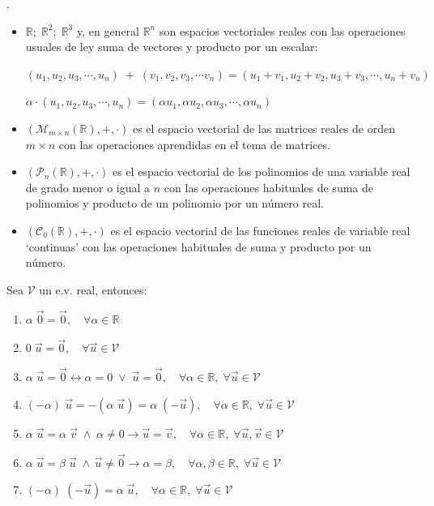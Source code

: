 \begin{ejem}.

\begin{itemize}

\item $\mathbb R; \; \mathbb R^2; \; \mathbb R^3$ y, en general $\mathbb R^n$  son espacios vectoriales reales con las operaciones usuales de ley suma de vectores y producto por un escalar:

$(u_1,u_2,u_3, \cdots, u_n)\; +\; (v_1,v_2,v_3, \cdots v_n)=(u_1+v_1, u_2+v_2, u_3+v_3, \cdots , u_n+v_n)$

 $\alpha \cdot (u_1,u_2,u_3, \cdots, u_n) =(\alpha u_1,\alpha u_2,\alpha u_3, \cdots, \alpha u_n)$

\item $(\mathcal M_{m \times n}(\mathbb R),+,\cdot)$ es el espacio vectorial de las matrices reales de orden $m \times n$ con las operaciones aprendidas en el tema de matrices.

\item $(\mathcal P_n(\mathbb R), +, \cdot)$ es el espacio vectorial de los polinomios de una variable real de grado menor o igual a $n$ con las operaciones habituales de suma de polinomios y producto de un polinomio por un número real.

\item $(\mathcal C_0(\mathbb R), +, \cdot)$ es el espacio vectorial de las funciones reales de variable real `continuas' con las operaciones habituales de suma y producto por un número.
\end{itemize}
\end{ejem}

\begin{prop} Sea $\mathcal V$ un e.v. real, entonces:
\begin{enumerate}[P1. ]
\item $\alpha \; \vec 0=\vec 0,\quad \forall \alpha \in \mathbb R$
\item $0 \; \vec u= \vec 0, \quad \forall \vec u \in \mathcal V$
\item $\alpha \; \vec u = \vec 0 \leftrightarrow \alpha = 0 \; \vee \; \vec u= \vec 0, \quad \forall \alpha \in \mathbb R,\; \forall \vec u \in \mathcal V$
\item $(-\alpha)\; \vec u=-(\alpha \; \vec u)=\alpha\;  (-\vec u),  \quad \forall \alpha \in \mathbb R,\; \forall \vec u \in \mathcal V$
\item $\alpha \; \vec u = \alpha\; \vec v \; \wedge \; \alpha \neq 0 \to \vec u = \vec v, \quad \forall \alpha \in \mathbb R,\; \forall \vec u, \vec v \in \mathcal V$
\item $\alpha \; \vec u = \beta \; \vec u \; \wedge \, \vec u \neq \vec 0 \to \alpha = \beta, \quad \forall \alpha, \beta \in \mathbb R,\; \forall \vec u \in \mathcal V$
\item $(-\alpha)\; (-\vec u)= \alpha \; \vec u , \quad \forall \alpha \in \mathbb R,\; \forall \vec u \in \mathcal V$
	
\end{enumerate}	
\end{prop}


